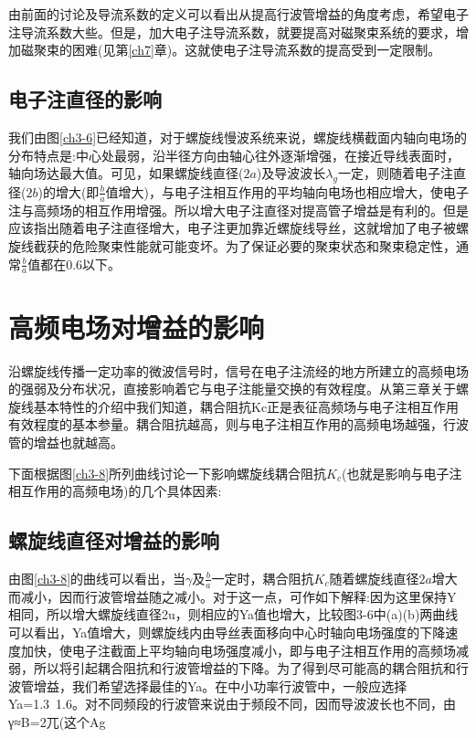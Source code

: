   由前面的讨论及导流系数的定义可以看出从提高行波管增益的角度考虑，希望电子注导流系数大些。但是，加大电子注导流系数，就要提高对磁聚束系统的要求，增加磁聚束的困难(见第\ref{ch7}章)。这就使电子注导流系数的提高受到一定限制。
	\subsection{电子注直径的影响}	
	我们由图\ref{ch3-6}已经知道，对于螺旋线慢波系统来说，螺旋线横截面内轴向电场的分布特点是:中心处最弱，沿半径方向由轴心往外逐渐增强，在接近导线表面时，轴向场达最大值。可见，如果螺旋线直径($ 2a $)及导波波长$ \lambda_g $一定，则随着电子注直径($ 2b $)的增大(即$ \frac{b}{a} $值增大)，与电子注相互作用的平均轴向电场也相应增大，使电子注与高频场的相互作用增强。所以增大电子注直径对提高管子增益是有利的。但是应该指出随着电子注直径增大，电子注更加靠近螺旋线导丝，这就增加了电子被螺旋线截获的危险聚束性能就可能变坏。为了保证必要的聚束状态和聚束稳定性，通常$ \frac{b}{a} $值都在0.6以下。




\section{高频电场对增益的影响}
沿螺旋线传播一定功率的微波信号时，信号在电子注流经的地方所建立的高频电场的强弱及分布状况，直接影响着它与电子注能量交换的有效程度。从第三章关于螺旋线基本特性的介绍中我们知道，耦合阻抗Kc正是表征高频场与电子注相互作用有效程度的基本参量。耦合阻抗越高，则与电子注相互作用的高频电场越强，行波管的增益也就越高。


下面根据图\ref{ch3-8}所列曲线讨论一下影响螺旋线耦合阻抗$ K_c $(也就是影响与电子注相互作用的高频电场)的几个具体因素:
 \subsection{螺旋线直径对增益的影响}
	
	由图\ref{ch3-8}的曲线可以看出，当$ \gamma $及$ \frac{b}{a} $一定时，耦合阻抗$ K_c $随着螺旋线直径$ 2a $增大而减小，因而行波管增益随之减小。对于这一点，可作如下解释:因为这里保持Y相同，所以增大螺旋线直径2u，则相应的Ya值也增大，比较图3-6中(a)(b)两曲线可以看出，Ya值增大，则螺旋线内由导丝表面移向中心时轴向电场强度的下降速度加快，使电子注截面上平均轴向电场强度减小，即与电子注相互作用的高频场减弱，所以将引起耦合阻抗和行波管增益的下降。为了得到尽可能高的耦合阻抗和行波管增益，我们希望选择最佳的Ya。在中小功率行波管中，一般应选择Ya=1.3~1.6。对不同频段的行波管来说由于频段不同，因而导波波长也不同，由γ≈B=2兀(这个Ag

